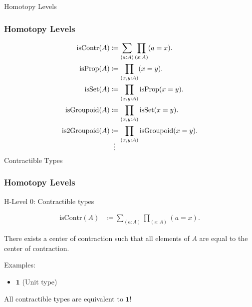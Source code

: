 \documentclass[9pt]{beamer}
\begin{document}
\begin{frame}{Homotopy Levels}
\frametitle{Homotopy Levels}

\begin{align*}
  \text{isContr}(A) & \coloneqq \sum_{(a:A)} \prod_{(x:A)} (a = x).
  \\
  \text{isProp}(A) & \coloneqq \prod_{(x,y:A)} (x = y).
  \\
  \text{isSet}(A) & \coloneqq \prod_{(x,y:A)} \text{isProp}(x = y).
  \\
  \text{isGroupoid}(A) & \coloneqq \prod_{(x,y:A)} \text{isSet}(x = y).
  \\
  \text{is2Groupoid}(A) & \coloneqq \prod_{(x,y:A)} \text{isGroupoid}(x = y).
  \\
  \shortvdotswithin{=}
\end{align*}

\end{frame}

\begin{frame}{Contractible Types}
\frametitle{Homotopy Levels}

H-Level 0: Contractible types

\begin{align*}
  \text{isContr}(A) & \coloneqq \sum_{(a:A)} \prod_{(x:A)} (a = x).
\end{align*}

There exists a \alert{center of contraction} such that all elements of $A$ are equal to
the center of contraction.

Examples:
\begin{itemize}
  \item $\mathbf{1}$ (Unit type)
\end{itemize}

All contractible types are equivalent to $\mathbf{1}$!

\end{frame}
\end{document}
